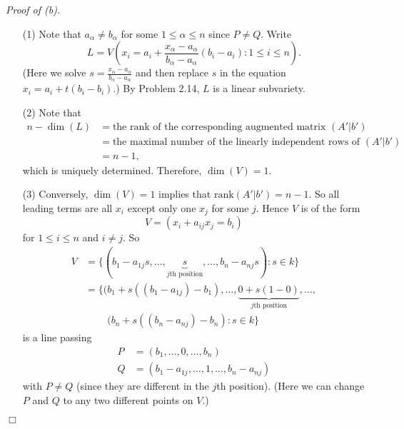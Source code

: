 \documentclass{article}
\begin{document}
\emph{Proof of (b).}
\begin{enumerate}
\item[(1)]
  Note that $a_{\alpha} \neq b_{\alpha}$ for some $1 \leq \alpha \leq n$ since $P \neq Q$.
  Write
  \[
    L
    =
    V\left( x_i = a_i + \frac{x_{\alpha}-a_{\alpha}}{b_{\alpha}-a_{\alpha}}(b_i - a_i)
      : 1 \leq i \leq n \right).
  \]
  (Here we solve $s = \frac{x_{\alpha}-a_{\alpha}}{b_{\alpha}-a_{\alpha}}$
  and then replace $s$ in the equation $x_i = a_i + t(b_i - b_i)$.)
  By Problem 2.14, $L$ is a linear subvariety.

\item[(2)]
  Note that
  \begin{align*}
    n - \dim(L)
    &= \text{the rank of the corresponding augmented matrix $(A'|b')$} \\
    &= \text{the maximal number of the linearly independent rows of $(A'|b')$} \\
    &= n - 1,
  \end{align*}
  which is uniquely determined.
  Therefore, $\dim(V) = 1$.

\item[(3)]
  Conversely, $\dim(V) = 1$ implies that $\mathrm{rank}(A'|b') = n - 1$.
  So all leading terms are all $x_i$ except only one $x_j$ for some $j$.
  Hence $V$ is of the form
  \[
    V
    = (x_i + a_{ij} x_j = b_i)
  \]
  for $1 \leq i \leq n$ and $i \neq j$.
  So
  \begin{align*}
    V
    &= \{ (b_1 - a_{1j}s, \ldots,
      \underbrace{s}_{\text{$j$th position}}, \ldots, b_n - a_{nj}s) : s \in k \} \\
    &= \{ (b_1 + s((b_1-a_{1j}) - b_1), \ldots,
      \underbrace{0 + s(1 - 0)}_{\text{$j$th position}}, \ldots, \\
      & \: \qquad (b_n + s((b_n-a_{nj}) - b_n) : s \in k \}
  \end{align*}
  is a line passing
  \begin{align*}
    P &= (b_1, \ldots, 0, \ldots, b_n) \\
    Q &= (b_1-a_{1j}, \ldots, 1, \ldots, b_n-a_{nj})
  \end{align*}
  with $P \neq Q$ (since they are different in the $j$th position).
  (Here we can change $P$ and $Q$ to any two different points on $V$.)
\end{enumerate}
$\Box$ \\
\end{document}
